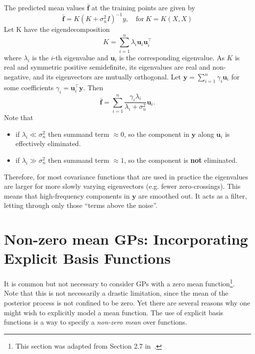 \documentclass{article}[12pt]
\begin{document}
The predicted mean values $\bar{\mathbf{f}}$ at the training points are given by
\begin{equation}
\bar{\mathbf{f}}=K(K+\sigma_n^2 I)^{-1}y,\quad\text{for}\ K=K(X,X)
\end{equation}
Let K have the eigendecomposition
\begin{equation}
K = \sum\limits_{i=1}^{n} \lambda_i \mathbf{u}_i\mathbf{u}_i^\top
\end{equation}
where $\lambda_i$ is the $i$-th eigenvalue and $\mathbf{u}_i$ is the corresponding eigenvalue. 
As $K$ is real and symmetric positive semidefinite, its eigenvalues are real and non-negative, and its
eigenvectors are mutually orthogonal.
Let $\mathbf{y}=\sum_{i=1}^{n}\gamma_i \mathbf{u}_i$ for some coefficients $\gamma_i=\mathbf{u}_i^\top \mathbf{y}$. Then
\begin{equation}
\bar{\mathbf{f}}=\sum\limits_{i=1}^n \frac{\gamma_i \lambda_i}{\lambda_i+\sigma_n^2}\mathbf{u}_i.
\end{equation}
Note that
\begin{itemize}[noitemsep,topsep=0pt]
	\item if $\lambda_i \ll \sigma_n^2$ then summand term $\approx 0$, so the component in $\mathbf{y}$ along $\mathbf{u}_i$ is effectively	eliminated.
	\item if $\lambda_i \gg \sigma_n^2$ then summand term $\approx 1$, so the component is \textbf{not} eliminated.
\end{itemize}
Therefore, for most covariance functions that are used in practice the eigenvalues are larger for more slowly varying eigenvectors (e.g. fewer zero-crossings). This means that high-frequency components in $\mathbf{y}$ are smoothed out.
It acts as a filter, letting through only those ``terms above the noise''.


\section{Non-zero mean GPs: Incorporating Explicit Basis Functions}
It is common but not necessary to consider GPs with a zero mean function\footnote{This section was adapted from Section 2.7 in~\cite{rasmussen:williams:2006}.}. Note that this is not necessarily a drastic limitation, since the mean of the
posterior process is not confined to be zero. Yet there are several reasons why
one might wish to explicitly model a mean function. The use of explicit basis functions is a way to specify a \textit{non-zero mean} over functions.
\end{document}
